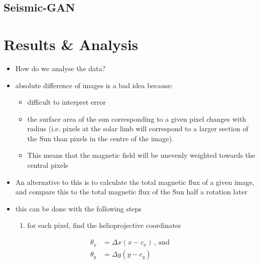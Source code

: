 \documentclass[11pt,a4paper,onecolumn]{report}
\begin{document}
\section{Seismic-GAN}





%
%
%
%
%
%
%
%
\chapter{Results \& Analysis}
%
%
%
%
%
%


\begin{itemize}
  \item How do we analyse the data?
  \item absolute difference of images is a bad idea because:
  \begin{itemize}
    \item difficult to interpret error
    \item the surface area of the sun corresponding to a given pixel changes
    with radius (i.e. pixels at the solar limb will correspond to a larger
    section of the Sun than pixels in the centre of the image).
    \item This means that the magnetic field will be unevenly weighted towards
    the central pixels
  \end{itemize}
  \item An alternative to this is to calculate the total magnetic flux of a
  given image, and compare this to the total magnetic flux of the Sun half a
  rotation later
  \item this can be done with the following steps
  \begin{enumerate}
    \item for each pixel, find the helioprojective coordinates
  \end{enumerate}
\end{itemize}

\begin{align}
  \theta_x &= \Delta x (x - c_x) \, \text{, and} \\
  \theta_y &= \Delta y (y - c_y)
\end{align}
\end{document}
